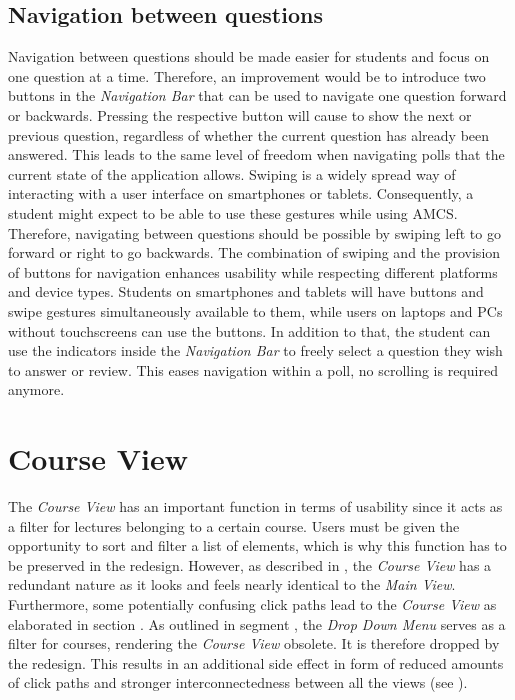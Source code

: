 \subsection{Navigation between questions}

Navigation between questions should be made easier for students and focus on one question at a time. Therefore, an improvement would be to introduce two buttons in the \emph{Navigation Bar} that can be used to navigate one question forward or backwards. Pressing the respective button will cause to show the next or previous question, regardless of whether the current question has already been answered. This leads to the same level of freedom when navigating polls that the current state of the application allows.
\newline
\newline
Swiping is a widely spread way of interacting with a user interface on smartphones or tablets. Consequently, a student might expect to be able to use these gestures while using AMCS. Therefore, navigating between questions should be possible by swiping left to go forward or right to go backwards. The combination of swiping and the provision of buttons for navigation enhances usability while respecting different platforms and device types. Students on smartphones and tablets will have buttons and swipe gestures simultaneously available to them, while users on laptops and PCs without touchscreens can use the buttons.
In addition to that, the student can use the indicators inside the \emph{Navigation Bar} to freely select a question they wish to answer or review. This eases navigation within a poll, no scrolling is required anymore.


\section{Course View}
The \emph{Course View} has an important function in terms of usability since it acts as a filter for lectures belonging to a certain course. Users must be given the opportunity to sort and filter a list of elements, which is why this function has to be preserved in the redesign. However, as described in , the \emph{Course View} has a redundant nature as it looks and feels nearly identical to the \emph{Main View}.
Furthermore, some potentially confusing click paths lead to the \emph{Course View} as elaborated in section .
As outlined in segment , the \emph{Drop Down Menu} serves as a filter for courses, rendering the \emph{Course View} obsolete. It is therefore dropped by the redesign. This results in an additional side effect in form of reduced amounts of click paths and stronger interconnectedness between all the views (see \todosct).
